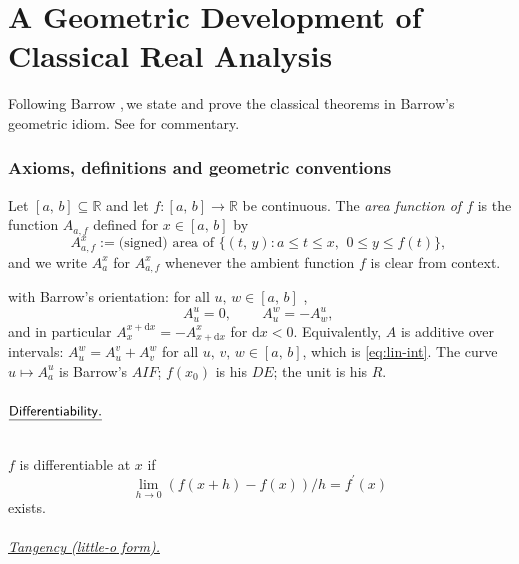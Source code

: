 \documentclass[11pt,reqno]{amsart}
\providecommand{\R}{\mathbb{R}}
\theoremstyle{redplain}
\begin{document}
\part{A Geometric Development of Classical Real Analysis}

\label{part:part1} \noindent Following Barrow \cite[Lecture~X, \S 11]%
{Barrow1916},\,\allowbreak we state and prove the classical theorems in
Barrow's geometric idiom. See \cite{Lopez2026} for commentary.

\section{Axioms, definitions and geometric conventions}

\label{sec:conventions}

Let $[a,\,\allowbreak b]\subseteq\R$ and let $f\colon[a,\,\allowbreak b]\to%
\R
$ be continuous. The \emph{area function of $f$} is the function $A_{a,f}$
defined for $x\in[a,\,\allowbreak b]$ by 
\begin{equation}  \label{eq:area}
A_{a,f}^{x}:=\text{(signed) area of }\{(t,\,\allowbreak y): a\le t\le
x,\,\allowbreak\ 0\le y\le f(t)\},\,\allowbreak
\end{equation}
and we write $A_a^x$ for $A_{a,f}^x$ whenever the ambient function $f$ is
clear from context.

with Barrow's orientation: for all $u,\,\allowbreak w\in[a,\,\allowbreak b]$%
, 
\begin{equation}  \label{eq:oriented-area}
A_u^{u}=0,\,\allowbreak\qquad A_u^{w}=-A_w^{u},\,\allowbreak
\end{equation}
and in particular $A_x^{x+\mathrm{d}x}=-A_{x+\mathrm{d}x}^{x}$ for $\mathrm{d%
}x<0$. Equivalently, $A$ is additive over intervals: $A_u^w=A_u^v+A_v^w$ for
all $u,\,\allowbreak v,\,\allowbreak w\in[a,\,\allowbreak b]$, which is %
\autoref{eq:lin-int}. The curve $u\mapsto A_a^u$ is Barrow's $AIF$; $f(x_0)$
is his $DE$; the unit is his $R$.

\paragraph{$\mathsf{\protect\underline{Differentiability.}}$}

\text{\ } $f$ is differentiable at $x$ if 
\begin{equation}  \label{eq:diff}
\lim_{h\to 0}(f(x+h)-f(x))/h=f^{\prime }(x)
\end{equation}
exists.

\paragraph{\textsf{\protect\underline{Tangency (little-\textit{o} form).}}}
\end{document}
